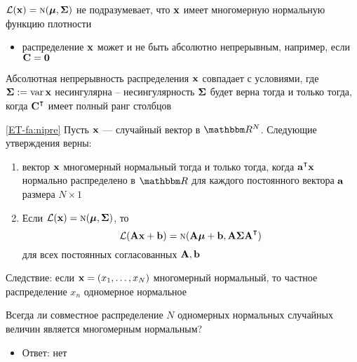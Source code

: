 \begin{frame}
    
    \vspace{2em}
   $\mathcal L({\mathbf x}) = \textrm{\sc n}({\boldsymbol \mu}, {\boldsymbol \Sigma})$ не подразумевает, что
    ${\mathbf x}$ имеет многомерную нормальную функцию плотности
    \begin{itemize}
        \item распределение ${\mathbf x}$ может и не быть абсолютно непрерывным, 
        например, если $\mathbf C = {\mathbf 0}$ 
    \end{itemize}
    
    \vspace{1em}
    Абсолютная непрерывность распределения ${\mathbf x}$ совпадает с 
    условиями, где ${\boldsymbol \Sigma} := \operatorname{var} {\mathbf x}$ несингулярна -- 
    несингулярность ${\boldsymbol \Sigma}$ будет верна тогда и только тогда, когда
    $\boldC^\T$ имеет полный ранг столбцов
    
\end{frame}

\begin{frame}
    
    \vspace{2em}
    \Fact\eqref{ET-fa:nipre}
    Пусть ${\mathbf x}$ --- случайный вектор в $\RR^N$. Следующие утверждения верны:
    \begin{enumerate}
        \item вектор ${\mathbf x}$ многомерный нормальный тогда и только тогда, когда
            $\bolda^\T \boldx$ нормально распределено в $\RR$ для каждого
            постоянного вектора ${\mathbf a}$ размера $N \times 1$ 
        \item Если $\mathcal L({\mathbf x}) = \textrm{\sc n}({\boldsymbol \mu}, {\boldsymbol \Sigma})$, то 
            \begin{equation*}
                  \lL(\boldA \boldx + \boldb) = \nN(\boldA \boldmu + \boldb, \boldA
                    \boldSigma \boldA^\T)  
            \end{equation*}
            для всех постоянных согласованных $\mathbf A, {\mathbf b}$
    \end{enumerate}
    
\end{frame}

\begin{frame}

    \vspace{2em}
    Следствие: если ${\mathbf x} = (x_1,
    \ldots, x_N)$ многомерный нормальный, то частное распределение 
    $x_n$ одномерное нормальное
    
    Всегда ли совместное распределение $N$ одномерных нормальных случайных величин 
    является многомерным нормальным? 
    \begin{itemize}
        \item Ответ: нет
    \end{itemize}
    
\end{frame}

